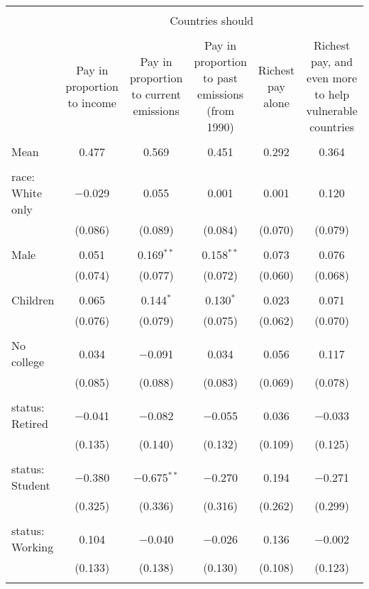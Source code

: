 
\begin{tabular}{@{\extracolsep{5pt}}lccccc} 
\\[-1.8ex]\hline 
\hline \\[-1.8ex] 
 & \multicolumn{5}{c}{Countries should} \\ 
\cline{2-6} 
\\[-1.8ex] & Pay in proportion to income & Pay in proportion to current emissions & Pay in proportion to past emissions (from 1990) & Richest pay alone & Richest pay, and even more to help vulnerable countries \\ 
\hline \\[-1.8ex] 
 Mean & 0.477 & 0.569 & 0.451 & 0.292 & 0.364  \\ \hline \\[-1.8ex] race: White only & $-$0.029 & 0.055 & 0.001 & 0.001 & 0.120 \\ 
  & (0.086) & (0.089) & (0.084) & (0.070) & (0.079) \\ 
  & & & & & \\ 
 Male & 0.051 & 0.169$^{**}$ & 0.158$^{**}$ & 0.073 & 0.076 \\ 
  & (0.074) & (0.077) & (0.072) & (0.060) & (0.068) \\ 
  & & & & & \\ 
 Children & 0.065 & 0.144$^{*}$ & 0.130$^{*}$ & 0.023 & 0.071 \\ 
  & (0.076) & (0.079) & (0.075) & (0.062) & (0.070) \\ 
  & & & & & \\ 
 No college & 0.034 & $-$0.091 & 0.034 & 0.056 & 0.117 \\ 
  & (0.085) & (0.088) & (0.083) & (0.069) & (0.078) \\ 
  & & & & & \\ 
 status: Retired & $-$0.041 & $-$0.082 & $-$0.055 & 0.036 & $-$0.033 \\ 
  & (0.135) & (0.140) & (0.132) & (0.109) & (0.125) \\ 
  & & & & & \\ 
 status: Student & $-$0.380 & $-$0.675$^{**}$ & $-$0.270 & 0.194 & $-$0.271 \\ 
  & (0.325) & (0.336) & (0.316) & (0.262) & (0.299) \\ 
  & & & & & \\ 
 status: Working & 0.104 & $-$0.040 & $-$0.026 & 0.136 & $-$0.002 \\ 
  & (0.133) & (0.138) & (0.130) & (0.108) & (0.123) \\ 
  & & & & & \\ 

\end{tabular}
